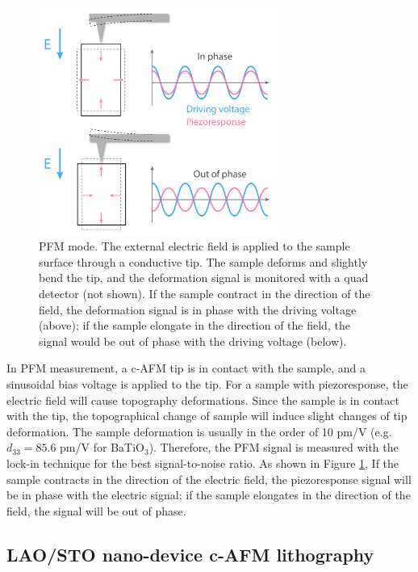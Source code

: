 \documentclass[pdflatex, sectionletters, 12pt, final, phd]{pittetd}    %
\begin{document}
\begin{figure}[p]
	\centering
	\includegraphics[width=0.7\textwidth]{Drawing/PFM.pdf}
	\caption[PFM mode]{PFM mode. The external electric field is applied to the sample surface through a conductive tip. The sample deforms and slightly bend the tip, and the deformation signal is monitored with a quad detector (not shown). If the sample contract in the direction of the field, the deformation signal is in phase with the driving voltage (above); if the sample elongate in the direction of the field, the signal would be out of phase with the driving voltage (below).}
	\label{FIG:PFM}
\end{figure}

In PFM measurement, a c-AFM tip is in contact with the sample, and a sinusoidal bias voltage is applied to the tip. For a sample with piezoresponse, the electric field will cause topography deformations. Since the sample is in contact with the tip, the topographical change of sample will induce slight changes of tip deformation. The sample deformation is usually in the order of 10 pm/V (e.g. $d_{33} = 85.6$ pm/V for BaTiO$_3$\cite{berlincourt1958elastic}). Therefore, the PFM signal is measured with the lock-in technique for the best signal-to-noise ratio. As shown in Figure \ref{FIG:PFM}, If the sample contracts in the direction of the electric field, the piezoresponse signal will be in phase with the electric signal; if the sample elongates in the direction of the field, the signal will be out of phase.

\subsection{LAO/STO nano-device c-AFM lithography}
\label{SEC:AFMLitho}
\end{document}
